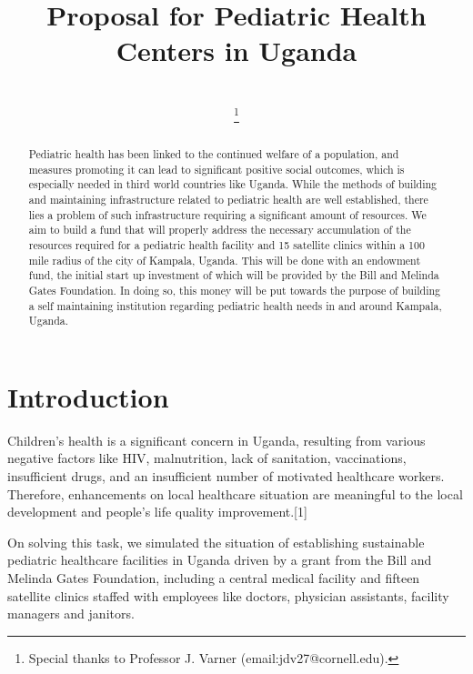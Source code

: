 \documentclass[10pt,twocolumn,twoside,final]{IEEEtran}
\begin{document}
\title{Proposal for Pediatric Health Centers in Uganda}


\author{\\
\thanks{Special thanks to Professor J. Varner (email:jdv27@cornell.edu).}}

\maketitle

\begin{abstract}
Pediatric health has been linked to the continued welfare of a population, and measures promoting it can lead to significant positive social outcomes, which is especially needed in third world countries like Uganda. While the methods of building and maintaining infrastructure related to pediatric health are well established, there lies a problem of such infrastructure requiring a significant amount of resources. We aim to build a fund that will properly address the necessary accumulation of the resources required for a pediatric health facility and 15 satellite clinics within a 100 mile radius of the city of Kampala, Uganda. This will be done with an endowment fund, the initial start up investment of which will be provided by the Bill and Melinda Gates Foundation. In doing so, this money will be put towards the purpose of building a self maintaining institution regarding pediatric health needs in and around Kampala, Uganda.
\end{abstract}


\section{Introduction}
Children's health is a significant concern in Uganda, resulting from various negative factors like HIV, malnutrition, lack of sanitation, vaccinations, insufficient drugs, and an insufficient number of motivated healthcare workers. Therefore, enhancements on local healthcare situation are meaningful to the local development and people’s life quality improvement.[1] 

On solving this task, we simulated the situation of establishing sustainable pediatric healthcare facilities in Uganda driven by a grant from the Bill and Melinda Gates Foundation, including a central medical facility and fifteen satellite clinics staffed with employees like doctors, physician assistants, facility managers and janitors. 
\end{document}
